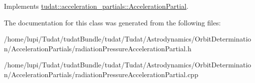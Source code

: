 Implements \hyperlink{classtudat_1_1acceleration__partials_1_1AccelerationPartial_a779c9c208d2054d8425178f4ea8f6021}{tudat\+::acceleration\+\_\+partials\+::\+Acceleration\+Partial}.



The documentation for this class was generated from the following files\+:\begin{DoxyCompactItemize}
\item 
/home/lupi/\+Tudat/tudat\+Bundle/tudat/\+Tudat/\+Astrodynamics/\+Orbit\+Determination/\+Acceleration\+Partials/radiation\+Pressure\+Acceleration\+Partial.\+h\item 
/home/lupi/\+Tudat/tudat\+Bundle/tudat/\+Tudat/\+Astrodynamics/\+Orbit\+Determination/\+Acceleration\+Partials/radiation\+Pressure\+Acceleration\+Partial.\+cpp\end{DoxyCompactItemize}
